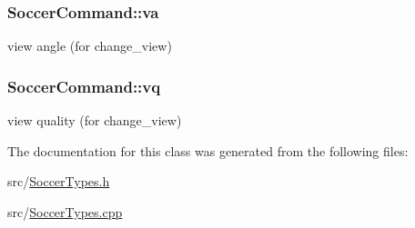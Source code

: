 \subsubsection[{\texorpdfstring{va}{va}}]{ Soccer\+Command\+::va}\hypertarget{classSoccerCommand_aa8709a9f44ea2feecd89dddf966dcb9e}{}\label{classSoccerCommand_aa8709a9f44ea2feecd89dddf966dcb9e}
view angle (for change\+\_\+view) 
\subsubsection[{\texorpdfstring{vq}{vq}}]{ Soccer\+Command\+::vq}\hypertarget{classSoccerCommand_a57d448f80f64ada2ca96506877bfc8b0}{}\label{classSoccerCommand_a57d448f80f64ada2ca96506877bfc8b0}
view quality (for change\+\_\+view) 

The documentation for this class was generated from the following files\+:\begin{DoxyCompactItemize}
\item 
src/\hyperlink{SoccerTypes_8h}{Soccer\+Types.\+h}\item 
src/\hyperlink{SoccerTypes_8cpp}{Soccer\+Types.\+cpp}\end{DoxyCompactItemize}
